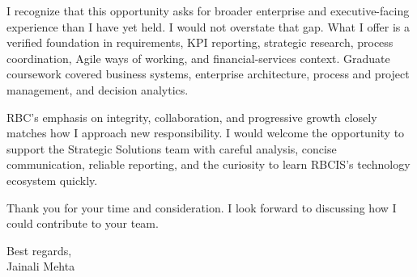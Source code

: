\documentclass[letterpaper,10pt]{article}
\begin{document}
I recognize that this opportunity asks for broader enterprise and executive-facing experience than I have yet held. I would not overstate that gap. What I offer is a verified foundation in requirements, KPI reporting, strategic research, process coordination, Agile ways of working, and financial-services context. Graduate coursework covered business systems, enterprise architecture, process and project management, and decision analytics.

RBC's emphasis on integrity, collaboration, and progressive growth closely matches how I approach new responsibility. I would welcome the opportunity to support the Strategic Solutions team with careful analysis, concise communication, reliable reporting, and the curiosity to learn RBCIS's technology ecosystem quickly.

Thank you for your time and consideration. I look forward to discussing how I could contribute to your team.

Best regards,\\[8pt]
Jainali Mehta
\end{document}
